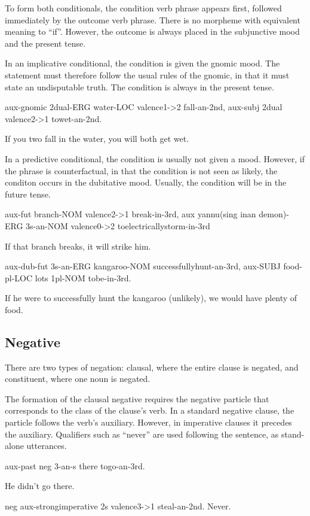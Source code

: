 To form both conditionals, the condition verb phrase appears first, followed
immediately by the outcome verb phrase. There is no morpheme with equivalent
meaning to ``if''. However, the outcome is always placed in the subjunctive
mood and the present tense.

In an implicative conditional, the condition is given the gnomic mood. The
statement must therefore follow the usual rules of the gnomic, in that it must
state an undisputable truth. The condition is always in the present tense.

aux-gnomic 2dual-ERG water-LOC valence1->2 fall-an-2nd, aux-subj 2dual
valence2->1 towet-an-2nd.

If you two fall in the water, you will both get wet.

In a predictive conditional, the condition is usually not given a mood.
However, if the phrase is counterfactual, in that the condition is not seen as
likely, the conditon occurs in the dubitative mood. Usually, the condition
will be in the future tense.

aux-fut branch-NOM valence2->1 break-in-3rd, aux yannu(sing inan demon)-ERG
3s-an-NOM valence0->2 toelectricallystorm-in-3rd

If that branch breaks, it will strike him.

aux-dub-fut 3s-an-ERG kangaroo-NOM successfullyhunt-an-3rd, aux-SUBJ food-pl-LOC
lots 1pl-NOM tobe-in-3rd.

If he were to successfully hunt the kangaroo (unlikely), we would have plenty of
food.

\subsection{Negative}

There are two types of negation: clausal, where the entire clause is negated,
and constituent, where one noun is negated.

The formation of the clausal negative requires the negative particle that
corresponds to the class of the clause's verb. In a standard negative clause,
the particle follows the verb's auxiliary. However, in imperative clauses it
precedes the auxiliary. Qualifiers such as ``never'' are used following the
sentence, as stand-alone utterances.

aux-past neg 3-an-s there togo-an-3rd.

He didn't go there.

neg aux-strongimperative 2s valence3->1 steal-an-2nd. Never.


